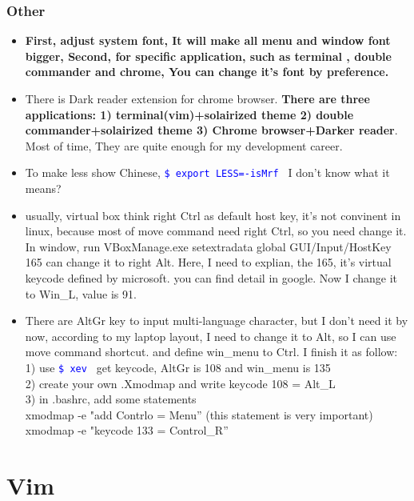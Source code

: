 \documentclass[a4paper,12pt,twoside]{book}
\newcommand{\linuxcommand}[1]{\texttt{\textcolor{blue}{\$ #1 \Pisymbol{psy}{191}}}}
\begin{document}
\begin{itemize}
\subsection{Other}
\begin{itemize}
		\item \textbf{First, adjust system font, It will make all menu and window font bigger, Second, for specific application, such as terminal , double commander and chrome, You can change it's font by preference. }

		\item There is Dark reader extension for chrome browser. \textbf{There are three applications: 1) terminal(vim)+solairized theme 2) double commander+solairized theme 3) Chrome browser+Darker reader}. Most of time, They are quite enough for my development career. 

    \item To make less show Chinese, \linuxcommand{export LESS=-isMrf} I don't know what it means?

    \item usually, virtual box think right Ctrl as default host key, it's not convinent in linux, because most of move command need right Ctrl, so you need change it.  In window, run VBoxManage.exe setextradata global GUI/Input/HostKey 165 can change it to right Alt. Here, I need to explian, the 165, it's virtual keycode defined by microsoft. you can find detail in google. Now I change it to Win\_L, value is 91.

	
\item There are AltGr key to input multi-language character, but I don't need it by now,
    according to my laptop layout, I need to change it to Alt, so I
	can use move command shortcut. and define win\_menu to Ctrl. I finish it as follow: \\
	1) use \linuxcommand{xev} get keycode, AltGr is 108 and win\_menu is 135 \\
	2) create your own .Xmodmap and write keycode 108 = Alt\_L\\
	3) in .bashrc, add some statements\\
	xmodmap -e "add Contrlo = Menu'' (this statement is very important)\\
	xmodmap -e "keycode 133 = Control\_R''\\
	\end{itemize}	

	
\chapter{Vim}

\end{itemize}
\end{document}

